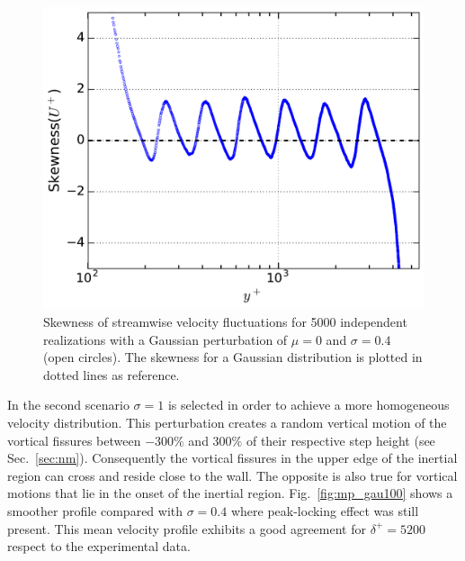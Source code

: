 \documentclass[aps,reprint,amsmath,amssymb,pra]{revtex4-1}%
\begin{document}
\begin{figure}[tb]
\includegraphics[scale=0.46]{figures/skewness_5000_assembles}
\caption{\label{fig:skewgaus} Skewness of streamwise velocity fluctuations for 5000 independent realizations with a Gaussian perturbation of $\mu=0$ and $\sigma=0.4$ (open circles). The skewness for a Gaussian distribution is plotted in dotted lines as reference.}
\end{figure}
In the second scenario $\sigma=1$ is selected in order to achieve a more homogeneous velocity distribution. This perturbation creates a random vertical motion of the vortical fissures between $-300\%$ and $300\%$ of their respective step height (see Sec.~\ref{sec:nm}). Consequently the vortical fissures in the upper edge of the inertial region can cross and reside close to the wall. The opposite is also true for vortical motions that lie in the onset of the inertial region. Fig.~\ref{fig:mp_gau100} shows a smoother profile compared with $\sigma=0.4$ where peak-locking effect was still present. This mean velocity profile exhibits a good agreement for $\delta^+=5200$ respect to the experimental data. 
\end{document}
